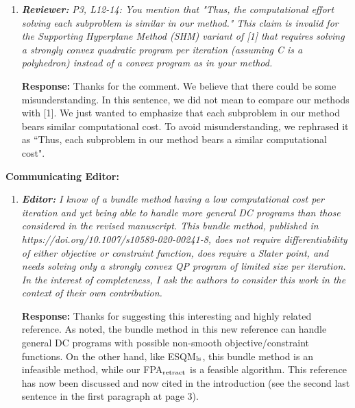 \documentclass{article}
\begin{document}
\begin{enumerate}
    \item \textit{\textbf{Reviewer:}} \textit{P3, L12-14: You mention that "Thus, the computational effort solving each subproblem is similar in our method."
        This claim is invalid for the Supporting Hyperplane Method (SHM) variant of [1] that requires solving a strongly convex quadratic program per iteration (assuming C is a polyhedron) instead of a convex program as in your method.}

    \textbf{Response:} Thanks for the comment.  We believe that there could be some misunderstanding. In this sentence, we did not mean to compare our methods with [1]. We just wanted to emphasize that each subproblem in our method bears similar computational cost. To avoid misunderstanding, we rephrased it as ``Thus, each subproblem in our method bears a similar computational cost".
\end{enumerate}
\textbf{Communicating Editor:}
\begin{enumerate}
        \item  \textit{\textbf{Editor:}} \textit{ I know of a bundle method having a low computational cost per iteration and yet being able to handle more general DC programs than those considered in the revised manuscript. This bundle method, published in https://doi.org/10.1007/s10589-020-00241-8, does not require differentiability of either objective or constraint function, does require a Slater point, and needs solving only a strongly convex QP program of limited size per iteration.  In the interest of completeness, I ask the authors to consider this work in the context of their own contribution.}

        \textbf{Response:} Thanks for suggesting this interesting and highly related reference. As noted, the bundle method in this new reference can handle general  DC programs with possible non-smooth objective/constraint functions. On the other hand, like ESQM$_{\rm ls}$, this bundle method is an infeasible method, while our FPA$_{\rm retract}$ is a feasible algorithm.  This reference has now been discussed and now cited in the introduction (see the second last sentence in the first paragraph at page 3).

\end{enumerate}
\end{document}
